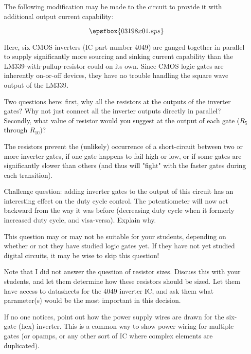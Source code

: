 

The following modification may be made to the circuit to provide it with additional output current capability:

$$\epsfbox{03198x01.eps}$$

Here, six CMOS inverters (IC part number 4049) are ganged together in parallel to supply significantly more sourcing and sinking current capability than the LM339-with-pullup-resistor could on its own.  Since CMOS logic gates are inherently on-or-off devices, they have no trouble handling the square wave output of the LM339.

Two questions here: first, why all the resistors at the outputs of the inverter gates?  Why not just connect all the inverter outputs directly in parallel?  Secondly, what value of resistor would you suggest at the output of each gate ($R_5$ through $R_{10}$)?







The resistors prevent the (unlikely) occurrence of a short-circuit between two or more inverter gates, if one gate happens to fail high or low, or if some gates are significantly slower than others (and thus will "fight" with the faster gates during each transition).

\vskip 10pt

Challenge question: adding inverter gates to the output of this circuit has an interesting effect on the duty cycle control.  The potentiometer will now act backward from the way it was before (decreasing duty cycle when it formerly increased duty cycle, and visa-versa).  Explain why.







This question may or may not be suitable for your students, depending on whether or not they have studied logic gates yet.  If they have not yet studied digital circuits, it may be wise to skip this question!

Note that I did not answer the question of resistor sizes.  Discuss this with your students, and let them determine how these resistors should be sized.  Let them have access to datasheets for the 4049 inverter IC, and ask them what parameter(s) would be the most important in this decision.

If no one notices, point out how the power supply wires are drawn for the six-gate (hex) inverter.  This is a common way to show power wiring for multiple gates (or opamps, or any other sort of IC where complex elements are duplicated).



